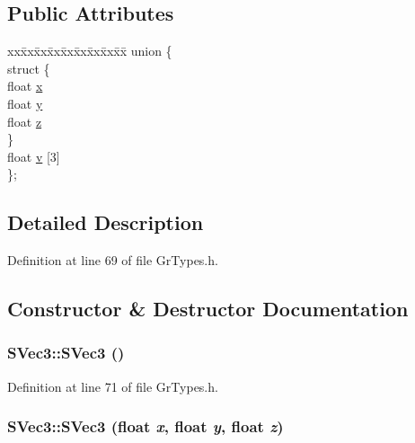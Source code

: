 \subsection*{Public Attributes}
\begin{CompactItemize}
\item 
\begin{tabbing}
xx\=xx\=xx\=xx\=xx\=xx\=xx\=xx\=xx\=\kill
union \{\\
\>struct \{\\
\>\>float \hyperlink{struct_s_vec3_a30ab4ca24f2b7968f6b21a97c28a812}{x}\\
\>\>float \hyperlink{struct_s_vec3_9e4d6ddc68169c650b437a7d1714f299}{y}\\
\>\>float \hyperlink{struct_s_vec3_d9d349dd9369afd5bd7d056e59b3ae4a}{z}\\
\>\} \\
\>float \hyperlink{struct_s_vec3_e77f7ec6dd4b23199dce3e4dfaee9804}{v} \mbox{[}3\mbox{]}\\
\}; \\

\end{tabbing}\end{CompactItemize}


\subsection{Detailed Description}


Definition at line 69 of file GrTypes.h.

\subsection{Constructor \& Destructor Documentation}
\hypertarget{struct_s_vec3_c7b69a9f9a0f36dd127aace025c8660a}{
\subsubsection[{SVec3}]{\setlength{\rightskip}{0pt plus 5cm}SVec3::SVec3 ()}}
\label{struct_s_vec3_c7b69a9f9a0f36dd127aace025c8660a}




Definition at line 71 of file GrTypes.h.\hypertarget{struct_s_vec3_3b9c3f6965913544d0f88d0dd4398e1d}{
\subsubsection[{SVec3}]{\setlength{\rightskip}{0pt plus 5cm}SVec3::SVec3 (float {\em x}, \/  float {\em y}, \/  float {\em z})}}
\label{struct_s_vec3_3b9c3f6965913544d0f88d0dd4398e1d}




